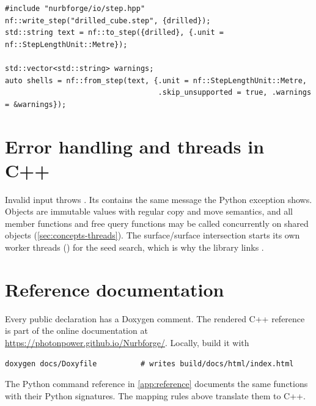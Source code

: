 \begin{lstlisting}[style=cpp]
#include "nurbforge/io/step.hpp"
nf::write_step("drilled_cube.step", {drilled});
std::string text = nf::to_step({drilled}, {.unit = nf::StepLengthUnit::Metre});

std::vector<std::string> warnings;
auto shells = nf::from_step(text, {.unit = nf::StepLengthUnit::Metre,
                                   .skip_unsupported = true, .warnings = &warnings});
\end{lstlisting}

\section{Error handling and threads in C++}\label{sec:cpp-errors}

Invalid input throws . Its  contains the same message the
Python exception shows. Objects are immutable values with regular copy and move semantics, and
all  member functions and free query functions may be called concurrently on shared
objects (\cref{sec:concepts-threads}). The surface/surface intersection starts its own worker
threads () for the seed search, which is why the library links
.

\section{Reference documentation}\label{sec:cpp-reference}

Every public declaration has a Doxygen comment. The rendered C++ reference is part of the online
documentation at \url{https://photonpower.github.io/Nurbforge/}. Locally, build it with
\begin{lstlisting}[style=shell]
doxygen docs/Doxyfile          # writes build/docs/html/index.html
\end{lstlisting}
The Python command reference in \cref{app:reference} documents the same functions with their
Python signatures. The mapping rules above translate them to C++.
